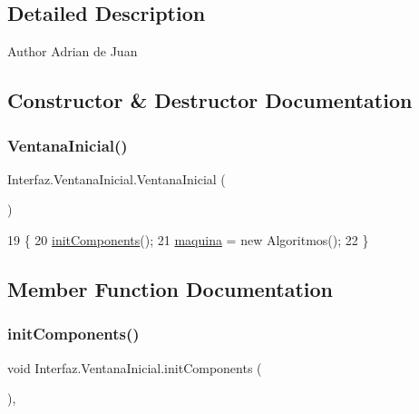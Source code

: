 \subsection{Detailed Description}
\begin{DoxyAuthor}{Author}
Adrian de Juan 
\end{DoxyAuthor}


\subsection{Constructor \& Destructor Documentation}
\mbox{\label{class_interfaz_1_1_ventana_inicial_a9e19b8b8cd08845d7b65b8f5f8b99d1e}} 
\subsubsection{\texorpdfstring{Ventana\+Inicial()}{VentanaInicial()}}
{\footnotesize\ttfamily Interfaz.\+Ventana\+Inicial.\+Ventana\+Inicial (\begin{DoxyParamCaption}{ }\end{DoxyParamCaption})\hspace{0.3cm}{\ttfamily [inline]}}


\begin{DoxyCode}
19                             \{
20         \mbox{\hyperlink{class_interfaz_1_1_ventana_inicial_a785fb25ee33e60680d1a39a6950235ef}{initComponents}}();
21          \mbox{\hyperlink{class_interfaz_1_1_ventana_inicial_a906577f94c1548333c5f598012939378}{maquina}} = \textcolor{keyword}{new} Algoritmos();
22     \}
\end{DoxyCode}


\subsection{Member Function Documentation}
\mbox{\label{class_interfaz_1_1_ventana_inicial_a785fb25ee33e60680d1a39a6950235ef}} 
\subsubsection{\texorpdfstring{init\+Components()}{initComponents()}}
{\footnotesize\ttfamily void Interfaz.\+Ventana\+Inicial.\+init\+Components (\begin{DoxyParamCaption}{ }\end{DoxyParamCaption})\hspace{0.3cm}{\ttfamily [inline]}, {\ttfamily [private]}}

